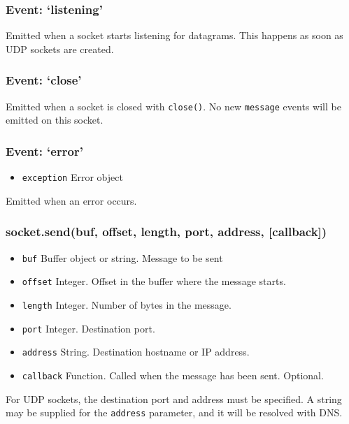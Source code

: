 \subsubsection{Event: `listening'}\label{event-listening}

Emitted when a socket starts listening for datagrams. This happens as
soon as UDP sockets are created.

\subsubsection{Event: `close'}\label{event-close}

Emitted when a socket is closed with \texttt{close()}. No new
\texttt{message} events will be emitted on this socket.

\subsubsection{Event: `error'}\label{event-error}

\begin{itemize}
\itemsep1pt\parskip0pt
\item
  \texttt{exception} Error object
\end{itemize}

Emitted when an error occurs.

\subsubsection{socket.send(buf, offset, length, port, address,
{[}callback{]})}\label{socket.sendbuf-offset-length-port-address-callback}

\begin{itemize}
\itemsep1pt\parskip0pt
\item
  \texttt{buf} Buffer object or string. Message to be sent
\item
  \texttt{offset} Integer. Offset in the buffer where the message
  starts.
\item
  \texttt{length} Integer. Number of bytes in the message.
\item
  \texttt{port} Integer. Destination port.
\item
  \texttt{address} String. Destination hostname or IP address.
\item
  \texttt{callback} Function. Called when the message has been sent.
  Optional.
\end{itemize}

For UDP sockets, the destination port and address must be specified. A
string may be supplied for the \texttt{address} parameter, and it will
be resolved with DNS.

